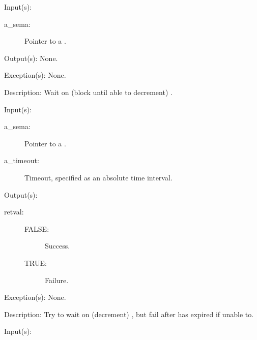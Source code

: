 \begin{capi}
\label{sema_wait}
	\begin{capilist}
	\item[Input(s): ]
		\begin{description}\item[]
		\item[a\_sema: ]
			Pointer to a .
		\end{description}
	\item[Output(s): ] None.
	\item[Exception(s): ] None.
	\item[Description: ]
		Wait on (block until able to decrement) .
	\end{capilist}
\label{sema_timedwait}
	\begin{capilist}
	\item[Input(s): ]
		\begin{description}\item[]
		\item[a\_sema: ]
			Pointer to a \classname{sema}.
		\item[a\_timeout: ]
			Timeout, specified as an absolute time interval.
		\end{description}
	\item[Output(s): ]
		\begin{description}\item[]
		\item[retval: ]
			\begin{description}\item[]
			\item[FALSE: ] Success.
			\item[TRUE: ] Failure.
			\end{description}
		\end{description}
	\item[Exception(s): ] None.
	\item[Description: ]
		Try to wait on (decrement) , but fail after
		 has expired if unable to.
	\end{capilist}
\label{sema_trywait}
	\begin{capilist}
	\item[Input(s): ]
		\begin{description}\item[]

\end{description}
\end{capilist}
\end{capi}

